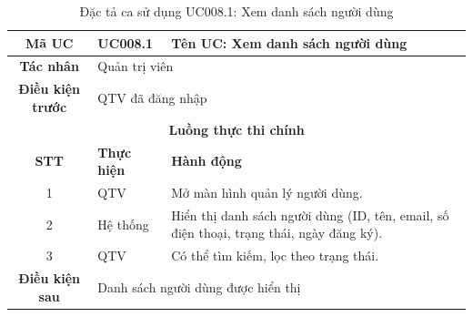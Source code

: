 \begin{table}[H]
    \centering
    \label{tab:uc008-1}
    \begin{tabularx}{\textwidth}{|c|p{3.5cm}|X|}
        \hline
        \rowcolor{headergreen} 
        \textbf{Mã UC} & \textbf{UC008.1} & \textbf{Tên UC: Xem danh sách người dùng} \\ \hline
        \textbf{Tác nhân} & \multicolumn{2}{l|}{Quản trị viên} \\ \hline
        \textbf{Điều kiện trước} & \multicolumn{2}{X|}{QTV đã đăng nhập} \\ \hline
        
        \multicolumn{3}{|c|}{\cellcolor{headerorange}\textbf{Luồng thực thi chính}} \\ \hline
        \rowcolor{graybg} \textbf{STT} & \textbf{Thực hiện} & \textbf{Hành động} \\ \hline
        1 & QTV & Mở màn hình quản lý người dùng. \\ \hline
        2 & Hệ thống & Hiển thị danh sách người dùng (ID, tên, email, số điện thoại, trạng thái, ngày đăng ký). \\ \hline
        3 & QTV & Có thể tìm kiếm, lọc theo trạng thái. \\ \hline
        
        \textbf{Điều kiện sau} & \multicolumn{2}{X|}{Danh sách người dùng được hiển thị} \\ \hline
    \end{tabularx}
    \caption{Đặc tả ca sử dụng UC008.1: Xem danh sách người dùng}
\end{table}


